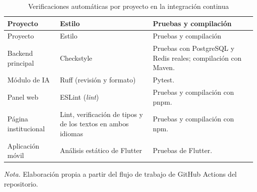 \begin{longtable}{>{\raggedright\arraybackslash}p{3.0cm} >{\raggedright\arraybackslash}p{4.4cm} >{\raggedright\arraybackslash}p{5.4cm}}
\caption{Verificaciones automáticas por proyecto en la integración continua}\label{tab:verificaciones_ci}\\
\toprule
Proyecto & Estilo & Pruebas y compilación \\
\midrule
\endfirsthead
\toprule
Proyecto & Estilo & Pruebas y compilación \\
\midrule
\endhead
\bottomrule
\endfoot
Backend principal & Checkstyle & Pruebas con PostgreSQL y Redis reales; compilación con Maven. \\
Módulo de IA & Ruff (revisión y formato) & Pytest. \\
Panel web & ESLint (\textit{lint}) & Pruebas y compilación con pnpm. \\
Página institucional & Lint, verificación de tipos y de los textos en ambos idiomas & Pruebas y compilación con npm. \\
Aplicación móvil & Análisis estático de Flutter & Pruebas de Flutter. \\
\end{longtable}
\noindent\textit{Nota.} Elaboración propia a partir del flujo de trabajo de GitHub Actions del repositorio.
